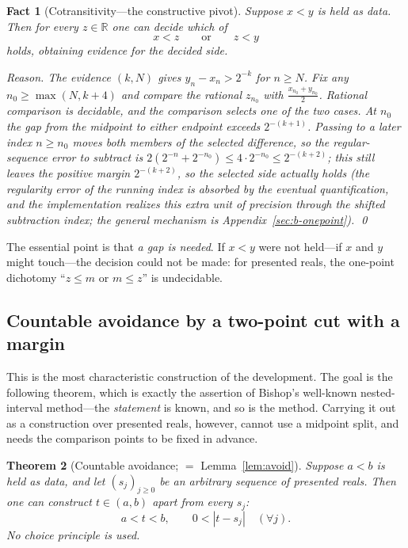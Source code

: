 \documentclass[11pt]{article}
\newtheorem{theorem}{Theorem}[section]
\newtheorem{fact}[theorem]{Fact}
\theoremstyle{definition}
\theoremstyle{remark}
\begin{document}
\begin{fact}[Cotransitivity---the constructive pivot]
\label{fact:b-cotrans}
Suppose $x<y$ is held \emph{as data}.  Then for every $z\in\mathbb{R}$ one can \emph{decide} which of
\[
x<z\qquad\text{or}\qquad z<y
\]
holds, obtaining evidence for the decided side.

\emph{Reason.}  The evidence $(k,N)$ gives $y_n-x_n>2^{-k}$ for $n\ge N$.  Fix any $n_0\ge\max(N,k+4)$ and compare the rational $z_{n_0}$ with $\tfrac{x_{n_0}+y_{n_0}}{2}$. Rational comparison is decidable, and the comparison selects one of the two cases. At $n_0$ the gap from the midpoint to either endpoint exceeds $2^{-(k+1)}$. Passing to a later index $n\ge n_0$ moves \emph{both} members of the selected difference, so the regular-sequence error to subtract is $2(2^{-n}+2^{-n_0})\le4\cdot2^{-n_0}\le2^{-(k+2)}$; this still leaves the positive margin $2^{-(k+2)}$, so the selected side actually holds (the regularity error of the running index is absorbed by the eventual quantification, and the implementation realizes this extra unit of precision through the shifted subtraction index; the general mechanism is Appendix~\ref{sec:b-onepoint}). \qed
\end{fact}

The essential point is that \emph{a gap is needed}.  If $x<y$ were not held---if $x$ and $y$ might touch---the decision could not be made: for presented reals, the one-point dichotomy ``$z\le m$ or $m\le z$'' is undecidable.

\subsection{Countable avoidance by a two-point cut with a margin}
\label{sec:b-avoidance}

This is the most characteristic construction of the development.  The goal is the following theorem, which is exactly the assertion of Bishop's well-known nested-interval method---the \emph{statement} is known, and so is the method.  Carrying it out as a construction over presented reals, however, cannot use a midpoint split, and needs the comparison points to be fixed in advance.

\begin{theorem}[Countable avoidance; $=$ Lemma~\ref{lem:avoid}]
\label{thm:b-avoid}
Suppose $a<b$ is held as data, and let $(s_j)_{j\ge0}$ be an arbitrary sequence of presented reals.  Then one can \emph{construct} $t\in(a,b)$ apart from every $s_j$:
\[
a<t<b,\qquad 0<|t-s_j|\quad(\forall j).
\]
No choice principle is used.
\end{theorem}
\end{document}
